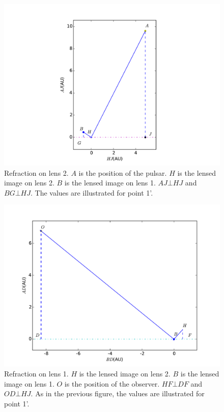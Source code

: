 \documentclass[useAMS,usenatbib]{mn2e}
\begin{document}
\begin{figure}
\centering
\includegraphics[width=1.0\linewidth,scale=1.0]{First_reflection.pdf}
\caption{Refraction on lens 2. 
$A$ is the position of the pulsar.  $H$ is the lensed image on lens 2.  $B$ is
the lensed image on lens 1. $AJ\bot HJ$ and $BG\bot HJ$.  The values are illustrated for point 1'.}
\label{first_reflect}
\end{figure}

\begin{figure}
\centering
\includegraphics[width=1.0\linewidth]{Second_reflection.pdf}
\caption{Refraction on lens 1. 
$H$ is the lensed image on lens 2. $B$ is the lensed image on lens 1. $O$ is the position of the observer. $HF\bot DF$ and $OD\bot HJ$. As in the previous figure, the values are illustrated for point 1'. }
\label{second_reflect}
\end{figure}
\end{document}
